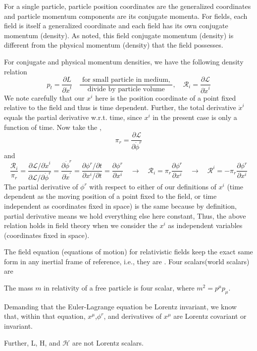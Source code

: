 For a single particle, particle position coordinates are the generalized coordinates and particle momentum components are its conjugate momenta. For fields, each field is itself a generalized coordinate and each field has its own conjugate momentum (density). As noted, this field conjugate momentum (density) is different from the physical momentum (density) that the field possesses.

For conjugate and physical momentum densities, we have the following density relation
$$
p_{t}=\frac{\partial L}{\partial \dot{x}^{t}} \quad \frac{\text { for small particle in medium, }}{\text { divide by particle volume }}, \quad \mathcal{R}_{i}=\frac{\partial \mathcal{L}}{\partial \dot{x}^{i}}
$$
We note carefully that our $x^i$ here is the position coordinate of a point fixed relative to the field and thus is time dependent. Further, the total derivative $\dot{x}^i$ equals the partial derivative w.r.t. time, since $x^i$ in the present case is only a function of time. Now take the ,
$$
\pi_{r}=\frac{\partial \mathcal{L}}{\partial \dot{\phi}^{r}}
$$
and
$$
\frac{\mathcal{R}_{i}}{\pi_{r}}=\frac{\partial \mathcal{L} / \partial \dot{x}^{i}}{\partial \mathcal{L} / \partial \dot{\phi}^{r}}=\frac{\partial \dot{\phi}^{r}}{\partial \dot{x}^{\prime}}=\frac{\partial \phi^{r} / \partial t}{\partial x^{i} / \partial t}=\frac{\partial \phi^{r}}{\partial x^{i}} \quad \rightarrow \quad \mathcal{R}_{i}=\pi_{r} \frac{\partial \phi^{r}}{\partial x^{i}} \quad \rightarrow \quad \mathcal{R}^{i}=-\pi_{r} \frac{\partial \phi^{r}}{\partial x^{i}}
$$
The partial derivative of $\phi^{r}$ with respect to either of our definitions of $x^{i}$ (time dependent as the moving position of a point fixed to the field, or time independent as coordinates fixed in space) is the same because by definition, partial derivative means we hold everything else here constant, Thus, the above relation holds in field theory when we consider the $x^{i}$ as independent variables (coordinates fixed in space).

The field equation (equations of motion) for relativistic fields keep the exact same form in any inertial frame of reference, i.e., they are . Four scalars(world scalars) are 
\begin{qt}
The mass $m$ in relativity of a free particle is four scalar, where $m^2=p^{\mu}p_{\mu}$.

Demanding that the Euler-Lagrange equation be Lorentz invariant, we know that, within that equation, $x^{\mu}$,$\phi^r$, and derivatives of $x^{\mu}$ are Lorentz covariant or invariant. 

Further, L, H, and $\mathcal{H}$ are not Lorentz scalars.
\end{qt}

